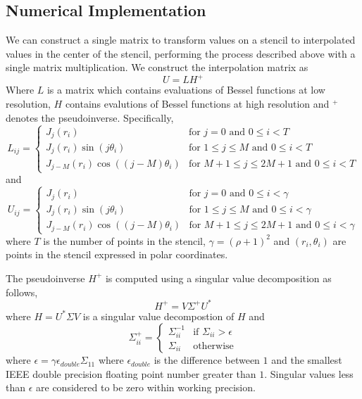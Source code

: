 \documentclass{report}
\begin{document}
\subsection{Numerical Implementation}
We can construct a single matrix to transform values on a stencil to interpolated values in the center of the stencil, performing the process described above with a single matrix multiplication. We construct the interpolation matrix as
\[
U = L H^{+}
\]
Where $L$ is a matrix which contains evaluations of Bessel functions at low resolution, $H$ contains evalutions of Bessel functions at high resolution and $^{+}$ denotes the pseudoinverse. Specifically,
\[
L_{ij} =\begin{cases}
J_{j}(r_{i}) & \text{for } j = 0 \text{ and } 0 \le i < T\\
J_{j}(r_{i}) \sin{(j \theta_{i})} & \text{for } 1 \le j \le M \text{ and } 0 \le i < T\\
J_{j-M}(r_{i}) \cos{((j-M) \theta_{i})} & \text{for } M+1 \le j \le 2M+1 \text{ and } 0 \le i < T
\end{cases}
\]
and
\[
U_{ij} =\begin{cases}
J_{j}(r_{i}) & \text{for } j = 0 \text{ and } 0 \le i < \gamma\\
J_{j}(r_{i}) \sin{(j \theta_{i})} & \text{for } 1 \le j \le M \text{ and } 0 \le i < \gamma\\
J_{j-M}(r_{i}) \cos{((j-M) \theta_{i})} & \text{for } M+1 \le j \le 2M+1 \text{ and } 0 \le i < \gamma
\end{cases}
\]
where $T$ is the number of points in the stencil, $\gamma = (\rho + 1)^{2}$ and $(r_{i},\theta_{i})$ are points in the stencil expressed in polar coordinates.

The pseudoinverse $H^{+}$ is computed using a singular value decomposition as follows,
\[
H^{+} = V \Sigma^{+} U^{*}
\]
where $H = U^{*} \Sigma V$ is a singular value decompostion of $H$ and
\[
\Sigma^{+}_{ii} =\begin{cases}
\Sigma_{ii}^{-1} & \text{if }\Sigma_{ii} > \epsilon\\
\Sigma_{ii} & \text{otherwise}
\end{cases}
\]
where $\epsilon = \gamma \epsilon_{double} \Sigma_{11}$ where $\epsilon_{double}$ is the difference between $1$ and the smallest IEEE double precision floating point number greater than $1$. Singular values less than $\epsilon$ are considered to be zero within working precision.
\end{document}
